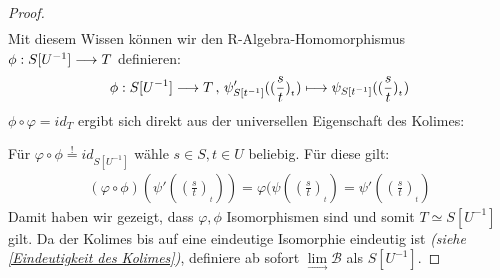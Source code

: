 \documentclass[10pt,a4paper]{report}
\newcommand{\functionfront}[3]{\nolinebreak{#1:#2 \longrightarrow #3}}
\newcommand{\function}[5]{\nolinebreak{#1:#2 \longrightarrow #3 \, , \, #4 \longmapsto #5}}
\newcommand{\lok}[2]{#1 [#2^{-1}]}
\newcommand{\loke}[3]{(\frac{#1}{#2})_{_{#3}}}
\newcommand{\colimes}[0]{\lim\limits_{ \longrightarrow }}
\newcommand*{\defshow}{\stackrel{!}{=}}
\begin{document}
\begin{proof}
\begin{align*}
\end{align*}
Mit diesem Wissen können wir den R-Algebra-Homomorphismus $\functionfront{\phi}{\lok{S}{U}}{T}$ definieren:
\begin{gather*}
\function{\phi}{\lok{S}{U}}{T}{\psi'_{\lok{S}{t}}(\loke{s}{t}{t})}{\psi_{\lok{S}{t}}(\loke{s}{t}{t})}
\end{gather*}
$\phi \circ \varphi = id_T$ ergibt sich direkt aus der universellen Eigenschaft des Kolimes:
\begin{center}
\end{center}
Für $\varphi \circ \phi \defshow id_{\lok{S}{U}}$ wähle $s \in S , t \in U$ beliebig. Für diese gilt:
\begin{gather*}
(\varphi \circ \phi)(\psi'(\loke{s}{t}{t})) =
 \varphi (\psi(\loke{s}{t}{t}) =
  \psi'(\loke{s}{t}{t})
\end{gather*}
Damit haben wir gezeigt, dass $\varphi,\phi$ Isomorphismen sind und somit $T \simeq \lok{S}{U}$ gilt. Da der Kolimes bis auf eine eindeutige Isomorphie eindeutig ist \textit{(siehe \cref{Eindeutigkeit des Kolimes})}, definiere ab sofort $\colimes \mathcal{B}$ als $\lok{S}{U}$.\end{proof}
\end{document}
